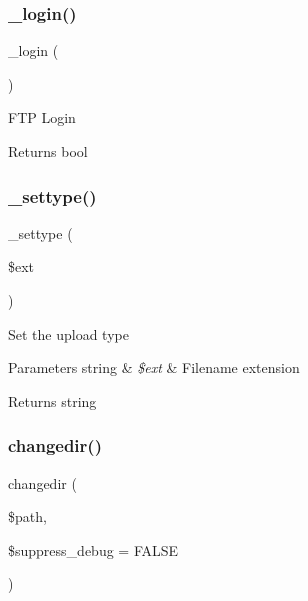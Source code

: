 \subsubsection{\texorpdfstring{\+\_\+login()}{\_login()}}
{\footnotesize\ttfamily \+\_\+login (\begin{DoxyParamCaption}{ }\end{DoxyParamCaption})\hspace{0.3cm}{\ttfamily [protected]}}

F\+TP Login

\begin{DoxyReturn}{Returns}
bool 
\end{DoxyReturn}
\mbox{\label{class_c_i___f_t_p_aacd9d6628615078d8df9aab1fe70e391}} 
\subsubsection{\texorpdfstring{\+\_\+settype()}{\_settype()}}
{\footnotesize\ttfamily \+\_\+settype (\begin{DoxyParamCaption}\item[{}]{\$ext }\end{DoxyParamCaption})\hspace{0.3cm}{\ttfamily [protected]}}

Set the upload type


\begin{DoxyParams}[1]{Parameters}
string & {\em \$ext} & Filename extension \\
\hline
\end{DoxyParams}
\begin{DoxyReturn}{Returns}
string 
\end{DoxyReturn}
\mbox{\label{class_c_i___f_t_p_a81098bf710d7879da8d69130f136475b}} 
\subsubsection{\texorpdfstring{changedir()}{changedir()}}
{\footnotesize\ttfamily changedir (\begin{DoxyParamCaption}\item[{}]{\$path,  }\item[{}]{\$suppress\+\_\+debug = {\ttfamily FALSE} }\end{DoxyParamCaption})}

